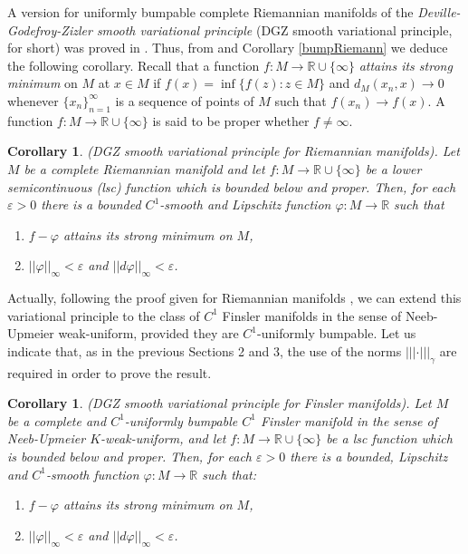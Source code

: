\documentclass[11pt]{amsart}
\newtheorem{cor}[thm]{Corollary}
\numberwithin{equation}{section}
\begin{document}
A version  for uniformly bumpable complete Riemannian manifolds of the {\em Deville-Godefroy-Zizler smooth variational principle}
\cite{Deville} (DGZ smooth variational principle, for short) was proved  in \cite{AzFeMe}. Thus, from \cite{AzFeMe} and Corollary \ref{bumpRiemann} we deduce  the following corollary.
Recall that a function $f:M \to {\mathbb{R}}\cup\{\infty\}$ {\em attains its strong minimum} on $M$ at $x\in M$ if $f(x)=\inf\{f(z):z\in M\}$ and $d_M(x_n,x)\to 0$ whenever $\{x_n\}_{n=1}^\infty$ is a sequence of points of $M$ such that  $f(x_n)\to f(x)$. A function
$f:M\to {\mathbb{R}}\cup\{\infty\}$ is said to be proper whether $f\neq \infty$.

\begin{cor}(DGZ smooth variational principle for Riemannian manifolds).
Let $M$ be a complete Riemannian manifold  and let $f:M\to {\mathbb{R}}\cup\{\infty\}$ be a lower semicontinuous (lsc) function which is bounded below and proper. Then, for each $\varepsilon>0$ there is a bounded $C^1$-smooth and Lipschitz function $\varphi:M\to{\mathbb{R}}$ such that
\begin{enumerate}
\item $f-\varphi$ attains its strong minimum on $M$,
\item $||\varphi||_\infty <\varepsilon$ and $||d\varphi||_\infty<\varepsilon$.
\end{enumerate}
\end{cor}

Actually,  following  the proof given for Riemannian manifolds  \cite{AzFeMe}, we can extend this variational principle to the class of  $C^1$  Finsler manifolds in the sense of Neeb-Upmeier weak-uniform, provided they are $C^1$-uniformly bumpable. Let us indicate that, as in the previous Sections 2 and 3, the use of the norms $|||\cdot|||_\gamma$ are required  in order to prove the result.
\begin{cor} \label{DGZfinslermanifolds} (DGZ smooth variational principle for Finsler manifolds).
Let $M$ be a complete and $C^1$-uniformly bumpable $C^1$ Finsler manifold in the sense of Neeb-Upmeier  $K$-weak-uniform, and let $f:M\to {\mathbb{R}}\cup\{\infty\}$ be a lsc function which is bounded below and proper. Then, for each $\varepsilon>0$ there is a bounded, Lipschitz and $C^1$-smooth function $\varphi:M\to{\mathbb{R}}$ such that:
\begin{enumerate}
\item $f-\varphi$ attains its strong minimum on $M$,
\item $||\varphi||_\infty <\varepsilon$ and $||d\varphi||_\infty<\varepsilon$.
\end{enumerate}
\end{cor}
\end{document}
